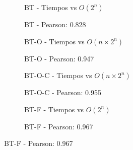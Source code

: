 \begin{figure}[H]
    \centering
    \begin{subfigure}[b]{0.48\textwidth}
        \centering
        
        \caption{BT - Tiempos vs $O(2^n)$}
    \end{subfigure}
    \hfill
    \begin{subfigure}[b]{0.42\textwidth}
        \centering
        
        \caption{BT - Pearson: 0.828}
    \end{subfigure}

    \begin{subfigure}[b]{0.48\textwidth}
        \centering
        
        \caption{BT-O - Tiempos vs $O(n \times 2^n)$}
    \end{subfigure}
    \hfill
    \begin{subfigure}[b]{0.42\textwidth}
        \centering
        
        \caption{BT-O - Pearson: 0.947}
    \end{subfigure}
    
    \begin{subfigure}[b]{0.48\textwidth}
        \centering
        
        \caption{BT-O-C - Tiempos vs $O(n \times 2^n)$}
    \end{subfigure}
    \hfill
    \begin{subfigure}[b]{0.42\textwidth}
        \centering
        
        \caption{BT-O-C - Pearson: 0.955}
    \end{subfigure}

    \begin{subfigure}[b]{0.48\textwidth}
        \centering
        
        \caption{BT-F - Tiempos vs $O(2^n)$}
    \end{subfigure}
    \hfill
    \begin{subfigure}[b]{0.42\textwidth}
        \centering
        
        \caption{BT-F - Pearson: 0.967}
    \end{subfigure}
\end{figure}

